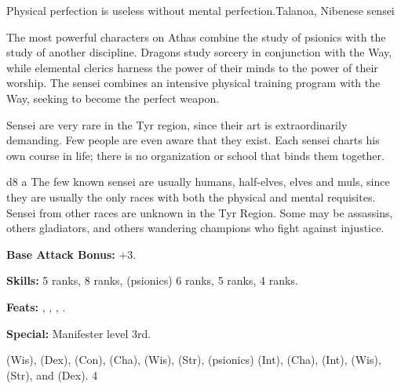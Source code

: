 {Physical perfection is useless without mental perfection.}{Talanoa, Nibenese sensei}
{The most powerful characters on Athas combine the study of psionics with the study of another discipline. Dragons study sorcery in conjunction with the Way, while elemental clerics harness the power of their minds to the power of their worship. The sensei combines an intensive physical training program with the Way, seeking to become the perfect weapon.

Sensei are very rare in the Tyr region, since their art is extraordinarily demanding. Few people are even aware that they exist. Each sensei charts his own course in life; there is no organization or school that binds them together.}
{d8}
{a}
{The few known sensei are usually humans, half-elves, elves and muls, since they are usually the only races with both the physical and mental requisites. Sensei from other races are unknown in the Tyr Region. Some may be assassins, others gladiators, and others wandering champions who fight against injustice.}
{
\textbf{Base Attack Bonus:} +3.

\textbf{Skills:}  5 ranks,  8 ranks,  (psionics) 6 ranks,  5 ranks,  4 ranks.

\textbf{Feats:} , , , .

\textbf{Special:} Manifester level 3rd.
}
{
 (Wis),  (Dex),  (Con),  (Cha),  (Wis),  (Str),  (psionics) (Int),  (Cha),  (Int),  (Wis),  (Str), and  (Dex).
}
{4}
